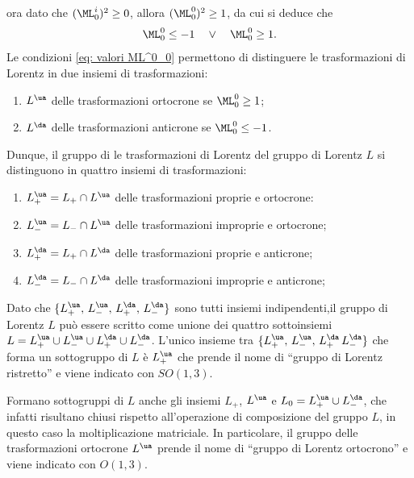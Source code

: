 ora dato che $(\ML^i_0)^2 \ge 0$, allora $(\ML^0_0)^2 \ge 1$, da cui si deduce che
\begin{equation}
\label{eq: valori ML^0_0}
    \ML^0_0 \le -1\quad\vee\quad\ML^0_0 \ge 1. 
\end{equation}
Le condizioni \eqref{eq: valori ML^0_0} permettono di distinguere le trasformazioni di Lorentz in due insiemi di trasformazioni:
\begin{enumerate}
    \item $L^\ua$ delle trasformazioni ortocrone se $\ML^0_0 \ge 1$;
    \item $L^\da$ delle trasformazioni anticrone se $\ML^0_0 \le -1$.
\end{enumerate}
Dunque, il gruppo di  le trasformazioni di Lorentz del gruppo di Lorentz $L$ si distinguono in quattro insiemi di trasformazioni:
\begin{enumerate}
    \item $L_+^\ua = L_+ \cap L^\ua$ delle trasformazioni proprie e ortocrone:
    \item $L^\ua_- = L_- \cap L^\ua$ delle trasformazioni improprie e ortocrone;
    \item $L^\da_+ = L_+ \cap L^\da$ delle trasformazioni proprie e anticrone;
    \item $L^\da_- = L_- \cap L^\da$ delle trasformazioni improprie e anticrone;
\end{enumerate}
Dato che $\{L_+^\ua,\,L^\ua_-,\,L^\da_+,\,L^\da_-\}$ sono tutti insiemi indipendenti,il gruppo di Lorentz $L$ può essere scritto come unione dei quattro sottoinsiemi $L = L_+^\ua \cup L^\ua_- \cup L^\da_+ \cup L^\da_-$. L'unico insieme tra $\{L_+^\ua,\,L^\ua_-,\,L^\da_+\,L^\da_-\}$ che forma un sottogruppo di $L$ è $L_+^\ua$ che prende il nome di ``gruppo di Lorentz ristretto'' e viene indicato con $SO(1,3)$. 
\begin{obs}
    Formano sottogruppi di $L$ anche gli insiemi $L_+$, $L^\ua$ e $L_0 = L^\ua_+ \cup L_-^\da$, che infatti risultano chiusi rispetto all'operazione di composizione del gruppo $L$, in questo caso la moltiplicazione matriciale. In particolare, il gruppo delle trasformazioni ortocrone $L^\ua$ prende il nome di ``gruppo di Lorentz ortocrono'' e viene indicato con $O(1,3)$.
\end{obs}


